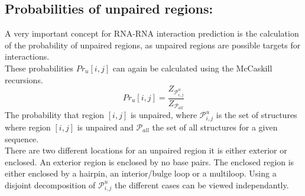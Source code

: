 \documentclass[11pt,a4paper]{report}
\begin{document}
\subsection*{Probabilities of unpaired regions:}
A very important concept for RNA-RNA interaction prediction is the calculation of the probability of unpaired regions, as unpaired regions are possible targets for interactions.\\
These probabilities $Pr_u[i,j]$ can again be calculated using the McCaskill recursions.\\
\begin{equation*}
Pr_u[i,j] = \frac{Z_{\mathcal{P}_{i,j}^u}}{Z_{\mathcal{P}_{all}}}
\end{equation*}
The probability that region $[i,j]$ is unpaired, where $\mathcal{P}_{i,j}^u$ is the set of structures where region $[i,j]$ is unpaired and $\mathcal{P}_{all}$ the set of all structures for a given sequence.\\
There are two different locations for an unpaired region it is either exterior or enclosed. An exterior region is enclosed by no base pairs. The enclosed region is either enclosed by a hairpin, an interior/bulge loop or a multiloop. Using a disjoint decomposition of $\mathcal{P}_{i,j}^u$ the different cases can be viewed independantly.\\
\end{document}
